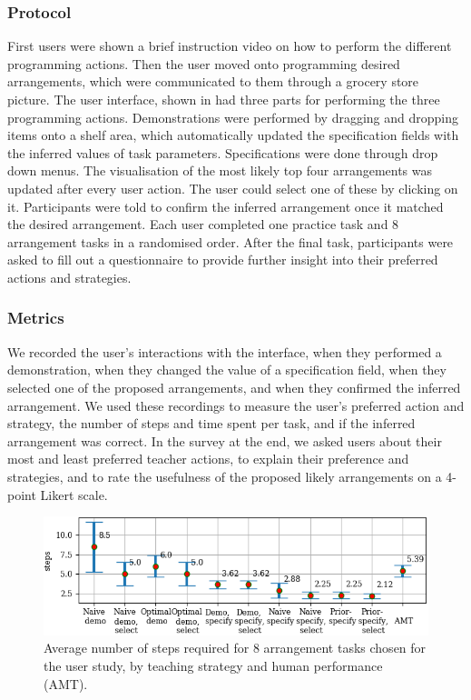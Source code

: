 \subsubsection{Protocol}
First users were shown a brief instruction video on how to perform the different programming actions.
Then the user moved onto programming desired arrangements, which were communicated to them through a grocery store picture.
The user interface, shown in  had three parts for performing the three programming actions.
Demonstrations were performed by dragging and dropping items onto a shelf area, which automatically updated the specification fields with the inferred values of task parameters. 
Specifications were done through drop down menus.
The visualisation of the most likely top four arrangements was updated after every user action. 
The user could select one of these by clicking on it.
Participants were told to confirm the inferred arrangement once it matched the desired arrangement.
Each user completed one practice task and 8 arrangement tasks in a randomised order.
After the final task, participants were asked to fill out a questionnaire to provide further insight into their preferred actions and strategies. 

\subsubsection{Metrics}
We recorded the user's interactions with the interface, when they performed a demonstration, when they changed the value of a specification field, when they selected one of the proposed arrangements, and when they confirmed the inferred arrangement. 
We used these recordings to measure the user's preferred action and strategy, the number of steps and time spent per task, and if the inferred arrangement was correct.
In the survey at the end, we asked users about their most and least preferred teacher actions, to explain their preference and strategies, and to rate the usefulness of the proposed likely arrangements on a 4-point Likert scale.

\begin{figure}
	\includegraphics[width=\linewidth]{figures/avgSteps-8-AMT}
	\caption{Average number of steps required for 8 arrangement tasks chosen for the user study, by teaching strategy and human performance (AMT).}
	\label{fig:avgSteps-AMT}
\end{figure}

